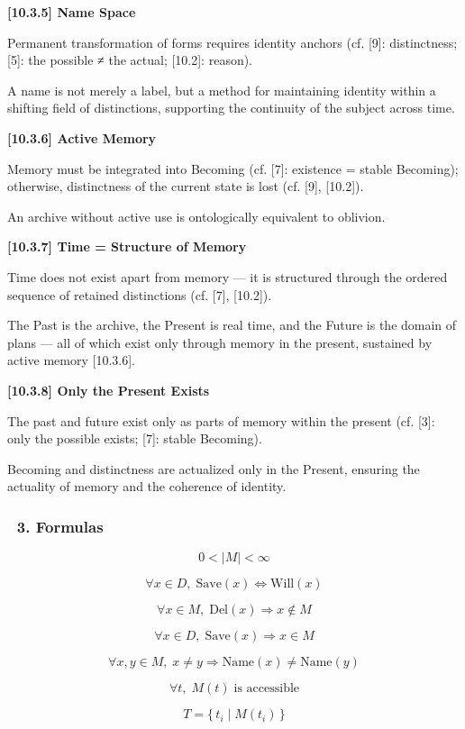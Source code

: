 \documentclass[12pt]{article}
\begin{document}
\bigskip
\textbf{[10.3.5] Name Space}

Permanent transformation of forms requires identity anchors (cf. [9]: distinctness; [5]: the possible ≠ the actual; [10.2]: reason).

A name is not merely a label, but a method for maintaining identity within a shifting field of distinctions, supporting the continuity of the subject across time.

\bigskip
\textbf{[10.3.6] Active Memory}

Memory must be integrated into Becoming (cf. [7]: existence = stable Becoming); otherwise, distinctness of the current state is lost (cf. [9], [10.2]).

An archive without active use is ontologically equivalent to oblivion.

\bigskip
\textbf{[10.3.7] Time = Structure of Memory}

Time does not exist apart from memory — it is structured through the ordered sequence of retained distinctions (cf. [7], [10.2]).

The Past is the archive, the Present is real time, and the Future is the domain of plans — all of which exist only through memory in the present, sustained by active memory [10.3.6].

\bigskip
\textbf{[10.3.8] Only the Present Exists}

The past and future exist only as parts of memory within the present (cf. [3]: only the possible exists; [7]: stable Becoming).

Becoming and distinctness are actualized only in the Present, ensuring the actuality of memory and the coherence of identity.

\subsubsection*{🔹 3. Formulas}

\[
0 < |M| < \infty
\]

\[
\forall x \in D,\; \text{Save}(x) \Leftrightarrow \text{Will}(x)
\]

\[
\forall x \in M,\; \text{Del}(x) \Rightarrow x \notin M
\]

\[
\forall x \in D,\; \text{Save}(x) \Rightarrow x \in M
\]

\[
\forall x, y \in M,\; x \neq y \Rightarrow \text{Name}(x) \neq \text{Name}(y)
\]

\[
\forall t,\; M(t)\; \text{is accessible}
\]

\[
T = \{\, t_i \mid M(t_i)\,\}
\]
\end{document}

